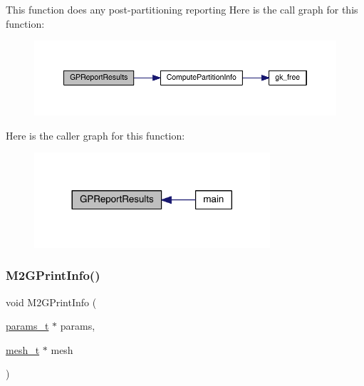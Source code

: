This function does any post-\/partitioning reporting Here is the call graph for this function\+:\nopagebreak
\begin{figure}[H]
\begin{center}
\leavevmode
\includegraphics[width=350pt]{a00948_aee005b8826ce55da90165e4a207f8f03_cgraph}
\end{center}
\end{figure}
Here is the caller graph for this function\+:\nopagebreak
\begin{figure}[H]
\begin{center}
\leavevmode
\includegraphics[width=248pt]{a00948_aee005b8826ce55da90165e4a207f8f03_icgraph}
\end{center}
\end{figure}
\mbox{\label{a00948_ac1de26132f220c8648448493e1c701c3}} 
\subsubsection{\texorpdfstring{M2\+G\+Print\+Info()}{M2GPrintInfo()}}
{\footnotesize\ttfamily void M2\+G\+Print\+Info (\begin{DoxyParamCaption}\item[{\hyperlink{a00706}{params\+\_\+t} $\ast$}]{params,  }\item[{\hyperlink{a00738}{mesh\+\_\+t} $\ast$}]{mesh }\end{DoxyParamCaption})}

